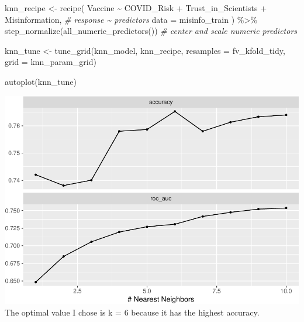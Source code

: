 \documentclass[
]{article}
\newenvironment{Shaded}{\begin{snugshade}}{\end{snugshade}}
\newcommand{\AttributeTok}[1]{\textcolor[rgb]{0.77,0.63,0.00}{#1}}
\newcommand{\CommentTok}[1]{\textcolor[rgb]{0.56,0.35,0.01}{\textit{#1}}}
\newcommand{\FunctionTok}[1]{\textcolor[rgb]{0.00,0.00,0.00}{#1}}
\newcommand{\NormalTok}[1]{#1}
\newcommand{\OtherTok}[1]{\textcolor[rgb]{0.56,0.35,0.01}{#1}}
\newcommand{\SpecialCharTok}[1]{\textcolor[rgb]{0.00,0.00,0.00}{#1}}
\begin{document}
\begin{Shaded}
\begin{Highlighting}[]
\NormalTok{knn\_recipe }\OtherTok{\textless{}{-}} \FunctionTok{recipe}\NormalTok{(}
\NormalTok{  Vaccine }\SpecialCharTok{\textasciitilde{}}\NormalTok{ COVID\_Risk }\SpecialCharTok{+}\NormalTok{ Trust\_in\_Scientists }\SpecialCharTok{+}\NormalTok{ Misinformation, }\CommentTok{\# response \textasciitilde{} predictors}
  \AttributeTok{data =}\NormalTok{ misinfo\_train}
\NormalTok{) }\SpecialCharTok{\%\textgreater{}\%}
  \FunctionTok{step\_normalize}\NormalTok{(}\FunctionTok{all\_numeric\_predictors}\NormalTok{()) }\CommentTok{\# center and scale numeric predictors}
\end{Highlighting}
\end{Shaded}

\begin{Shaded}
\begin{Highlighting}[]
\NormalTok{knn\_tune }\OtherTok{\textless{}{-}} \FunctionTok{tune\_grid}\NormalTok{(knn\_model, }
\NormalTok{                      knn\_recipe, }
                      \AttributeTok{resamples =}\NormalTok{ fv\_kfold\_tidy, }
                      \AttributeTok{grid =}\NormalTok{ knn\_param\_grid)}
\end{Highlighting}
\end{Shaded}

\begin{Shaded}
\begin{Highlighting}[]
\FunctionTok{autoplot}\NormalTok{(knn\_tune)}
\end{Highlighting}
\end{Shaded}

\includegraphics{Homework4_files/figure-latex/unnamed-chunk-7-1.pdf} The
optimal value I chose is k = 6 because it has the highest accuracy.
\end{document}
